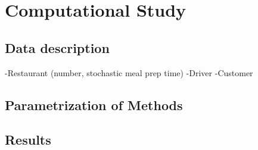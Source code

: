 \chapter{Computational Study}

\section{Data description}
-Restaurant (number, stochastic meal prep time) 
-Driver 
-Customer 
\section{Parametrization of Methods}

\section{Results}







